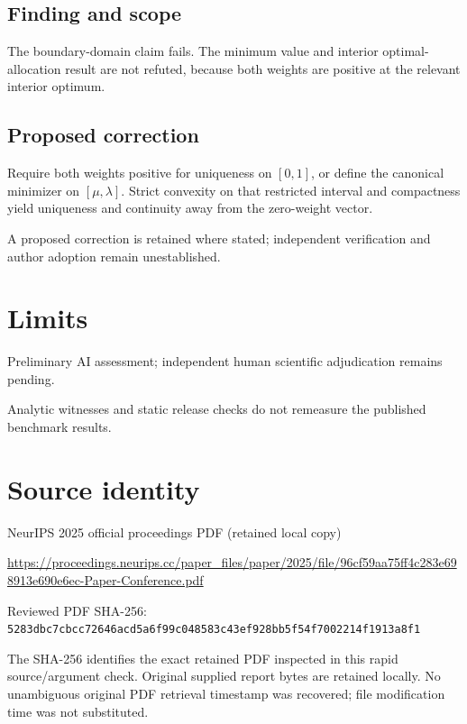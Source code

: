 \documentclass[11pt]{article}
\begin{document}
\subsection*{Finding and scope}

The boundary-domain claim fails. The minimum value and interior optimal-allocation result are not refuted, because both weights are positive at the relevant interior optimum.

\subsection*{Proposed correction}

Require both weights positive for uniqueness on \([0,1]\), or define the canonical minimizer on \([\mu,\lambda]\). Strict convexity on that restricted interval and compactness yield uniqueness and continuity away from the zero-weight vector.

A proposed correction is retained where stated; independent verification and author adoption remain unestablished.

\section*{Limits}

Preliminary AI assessment; independent human scientific adjudication remains pending.\par

Analytic witnesses and static release checks do not remeasure the published benchmark results.\par

\section*{Source identity}

NeurIPS 2025 official proceedings PDF (retained local copy)

\url{https://proceedings.neurips.cc/paper_files/paper/2025/file/96cf59aa75ff4c283e698913e690e6ec-Paper-Conference.pdf}

Reviewed PDF SHA-256: \nolinkurl{5283dbc7cbcc72646acd5a6f99c048583c43ef928bb5f54f7002214f1913a8f1}

The SHA-256 identifies the exact retained PDF inspected in this rapid source/argument check. Original supplied report bytes are retained locally. No unambiguous original PDF retrieval timestamp was recovered; file modification time was not substituted.
\end{document}
